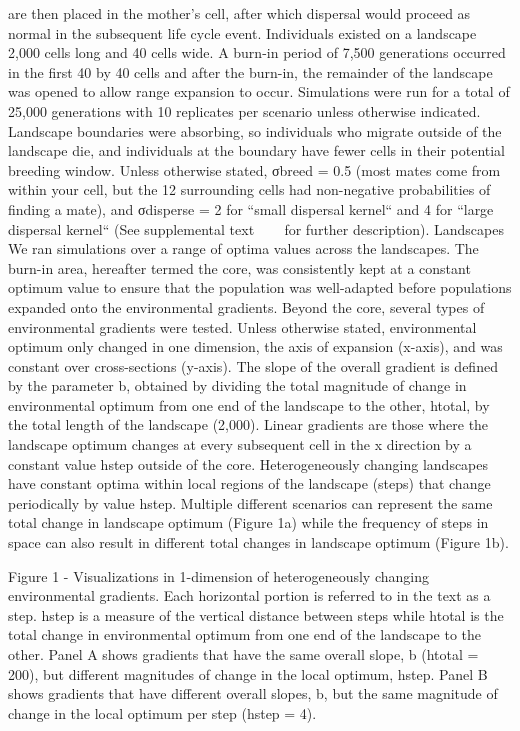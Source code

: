 are then placed in the mother’s cell, after which dispersal would proceed as normal in the 
subsequent life cycle event.
Individuals existed on a landscape 2,000 cells long and 40 cells wide. A burn-in period 
of 7,500 generations occurred in the first 40 by 40 cells and after the burn-in, the 
remainder of the landscape was opened to allow range expansion to occur. Simulations 
were run for a total of 25,000 generations with 10 replicates per scenario unless otherwise 
indicated. Landscape boundaries were absorbing, so individuals who migrate outside of the 
landscape die, and individuals at the boundary have fewer cells in their potential breeding 
window. Unless otherwise stated, σbreed = 0.5 (most mates come from within your cell, but 
the 12 surrounding cells had non-negative probabilities of finding a mate), and σdisperse = 2 
for ``small dispersal kernel`` and 4 for ``large dispersal kernel`` (See supplemental text ~~~ for 
further description). 
Landscapes
We ran simulations over a range of optima values across the landscapes. The burn-in area, 
hereafter termed the core, was consistently kept at a constant optimum value to ensure that 
the population was well-adapted before populations expanded onto the environmental gradients. 
Beyond the core, several types of environmental gradients were tested. Unless otherwise stated, 
environmental optimum only changed in one dimension, the axis of expansion (x-axis), and was 
constant over cross-sections (y-axis). The slope of the overall gradient is defined by the 
parameter b, obtained by dividing the total magnitude of change in environmental optimum 
from one end of the landscape to the other, htotal, by the total length of the landscape (2,000). 
Linear gradients are those where the landscape optimum changes at every subsequent cell in the x 
direction by a constant value hstep outside of the core. Heterogeneously changing landscapes have 
constant optima within local regions of the landscape (steps) that change periodically by value hstep. 
Multiple different scenarios can represent the same total change in landscape optimum (Figure 1a) 
while the frequency of steps in space can also result in different total changes in landscape 
optimum (Figure 1b).

Figure 1 - Visualizations in 1-dimension of heterogeneously changing environmental gradients. 
Each horizontal portion is referred to in the text as a step. hstep is a measure of the vertical 
distance between steps while htotal is the total change in environmental optimum from one end 
of the landscape to the other. Panel A shows gradients that have the same overall slope, b (htotal = 200), 
but different magnitudes of change in the local optimum, hstep. Panel B shows gradients that 
have different overall slopes, b, but the same magnitude of change in the local optimum per 
step (hstep = 4).

